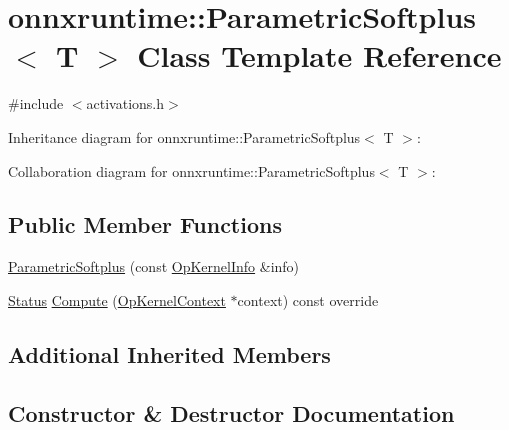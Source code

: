 \hypertarget{classonnxruntime_1_1ParametricSoftplus}{}\section{onnxruntime\+:\+:Parametric\+Softplus$<$ T $>$ Class Template Reference}
\label{classonnxruntime_1_1ParametricSoftplus}


{\ttfamily \#include $<$activations.\+h$>$}



Inheritance diagram for onnxruntime\+:\+:Parametric\+Softplus$<$ T $>$\+:


Collaboration diagram for onnxruntime\+:\+:Parametric\+Softplus$<$ T $>$\+:
\subsection*{Public Member Functions}
\begin{DoxyCompactItemize}
\item 
\mbox{\hyperlink{classonnxruntime_1_1ParametricSoftplus_a6247cbdc5c7a950ac659c073c502b662}{Parametric\+Softplus}} (const \mbox{\hyperlink{classonnxruntime_1_1OpKernelInfo}{Op\+Kernel\+Info}} \&info)
\item 
\mbox{\hyperlink{classonnxruntime_1_1common_1_1Status}{Status}} \mbox{\hyperlink{classonnxruntime_1_1ParametricSoftplus_af14529649d60d13215bde30520a59554}{Compute}} (\mbox{\hyperlink{classonnxruntime_1_1OpKernelContext}{Op\+Kernel\+Context}} $\ast$context) const override
\end{DoxyCompactItemize}
\subsection*{Additional Inherited Members}


\subsection{Constructor \& Destructor Documentation}
\mbox{\label{classonnxruntime_1_1ParametricSoftplus_a6247cbdc5c7a950ac659c073c502b662}} 
